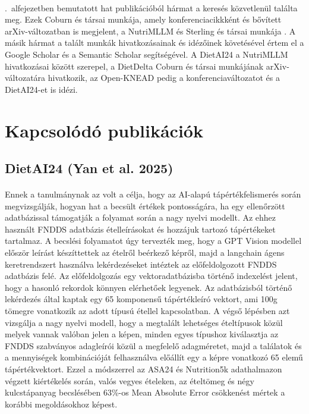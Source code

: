 \paragraph{}\Az{\ref{sec:kapcsolodo_publikaciok}}.~alfejezetben bemutatott hat publikációból hármat a keresés közvetlenül 
találta meg. Ezek Coburn és társai munkája, amely konferenciacikkként \cite{coburn2025bhi} és bővített 
arXiv-változatban \cite{coburn2025acetada} is megjelent, a NutriMLLM \cite{yan2026nutrimllm} és Sterling és társai 
munkája \cite{sterling2026vlm}. A másik hármat a talált munkák hivatkozásainak és idézőinek követésével értem el 
a Google Scholar és a Semantic Scholar segítségével. A DietAI24 \cite{yan2025dietai24} a NutriMLLM hivatkozásai 
között szerepel, a DietDelta \cite{vinod2026dietdelta} Coburn és társai munkájának arXiv-változatára hivatkozik, 
az Open-KNEAD \cite{coburn2026openknead} pedig a konferenciaváltozatot és a DietAI24-et is idézi.

\section{Kapcsolódó publikációk}
\label{sec:kapcsolodo_publikaciok}
\subsection{DietAI24 (Yan et al. 2025)}
\paragraph{}Ennek a tanulmánynak \cite{yan2025dietai24} az volt a célja, hogy az AI-alapú tápértékfelismerés során
megvizsgálják, hogyan hat a becsült értékek pontosságára, ha egy ellenőrzött adatbázissal támogatják a folyamat során a nagy nyelvi modellt. Az ehhez használt FNDDS adatbázis ételleírásokat és hozzájuk tartozó tápértékeket tartalmaz. A becslési folyamatot úgy tervezték meg, hogy a GPT Vision modellel először leírást készíttettek az ételről beérkező képről, majd a langchain ágens keretrendszert használva lekérdezéseket intéztek az előfeldolgozott FNDDS adatbázis felé.
Az előfeldolgozás egy vektoradatbázisba történő indexelést jelent, hogy a hasonló rekordok könnyen elérhetőek legyenek.
Az adatbázisból történő lekérdezés által kaptak egy 65 komponensű tápértékleíró vektort, ami 100g tömegre vonatkozik az adott típusú étellel kapcsolatban.
A végső lépésben azt vizsgálja a nagy nyelvi modell, hogy a megtalált lehetséges ételtípusok közül
melyek vannak valóban jelen a képen, minden egyes típushoz kiválasztja az FNDDS szabványos adagleírói közül a megfelelő adagméretet, majd a találatok és
a mennyiségek kombinációját felhasználva előállít egy a képre vonatkozó 65 elemű tápértékvektort.
Ezzel a módszerrel az ASA24 és Nutrition5k adathalmazon végzett kiértékelés során, valós vegyes ételeken, az ételtömeg és négy kulcstápanyag becslésében 63\%-os Mean Absolute Error csökkenést mértek a korábbi megoldásokhoz képest. 

